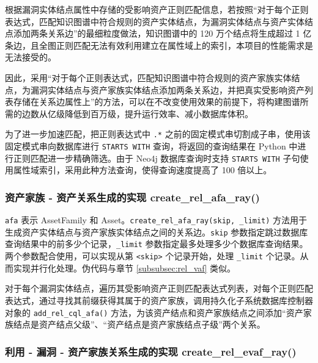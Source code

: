 \documentclass[a4paper,AutoFakeBold,oneside,12pt]{book}
\begin{document}
根据漏洞实体结点属性中存储的受影响资产正则匹配信息，若按照“对于每个正则表达式，匹配知识图谱中符合规则的资产实体结点，为漏洞实体结点与资产实体结点添加两条关系边”的最细粒度做法，知识图谱中的 120 万个结点将生成超过 1 亿条边，且全图正则匹配无法有效利用建立在属性域上的索引，本项目的性能需求是无法接受的。

因此，采用“对于每个正则表达式，匹配知识图谱中符合规则的资产家族实体结点，为漏洞实体结点与资产家族实体结点添加两条关系边，并把真实受影响资产列表存储在关系边属性上”的方法，可以在不改变使用效果的前提下，将构建图谱所需的边数从亿级降低到百万级，提升运行效率、减小数据库体积。

为了进一步加速匹配，把正则表达式中 \lstinline|.*| 之前的固定模式串切割成子串，使用该固定模式串向数据库进行 \lstinline|STARTS WITH| 查询，将返回的查询结果在 Python 中进行正则匹配进一步精确筛选。由于 Neo4j 数据库查询时支持 \lstinline|STARTS WITH| 子句使用属性域索引，采用此种方法查询，使得查询速度提高了 100 倍以上。

\subsubsection{资产家族 - 资产关系生成的实现 create{\_}rel{\_}afa{\_}ray()}

\lstinline|afa| 表示 AssetFamily 和 Asset。\lstinline|create_rel_afa_ray(skip, _limit)| 方法用于生成资产实体结点与资产家族实体结点之间的关系边。\lstinline|skip| 参数指定跳过数据库查询结果中的前多少个记录，\lstinline|_limit| 参数指定最多处理多少个数据库查询结果。两个参数配合使用，可以实现从第 \lstinline|<skip>| 个记录开始，处理 \lstinline|_limit| 个记录。从而实现并行化处理。伪代码与章节 \ref{subsubsec:rel_vaf}  类似。

对于每个漏洞实体结点，遍历其受影响资产正则匹配表达式列表，对每个正则匹配表达式，通过寻找其前缀获得其属于的资产家族，调用持久化子系统数据库控制器对象的 \lstinline|add_rel_cql_afa()| 方法，为该资产结点和资产家族结点之间添加“资产家族结点是资产结点父级”、“资产结点是资产家族结点子级”两个关系。

\subsubsection{利用 - 漏洞 - 资产家族关系生成的实现 create{\_}rel{\_}evaf{\_}ray()}
\end{document}
